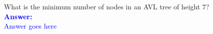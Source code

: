 \item{}
What is the minimum number of nodes in an AVL tree of height $7$?\\[12pt]
\ifanswers
\textcolor{blue}{
\textbf{Answer:}\\[6pt]
Answer goes here
}
\newpage
\fi
